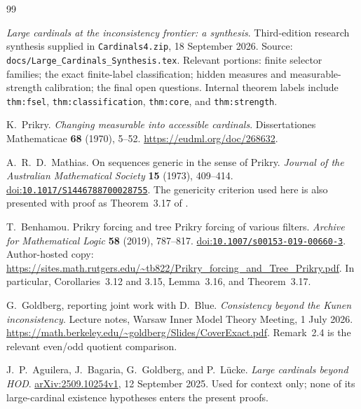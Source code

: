 \documentclass[11pt,letterpaper]{article}
\theoremstyle{definition}
\numberwithin{equation}{section}
\newcommand{\arxiv}[1]{\href{https://arxiv.org/abs/#1}{arXiv:#1}}
\newcommand{\doi}[1]{\href{https://doi.org/#1}{doi:\nolinkurl{#1}}}
\begin{document}
{}
\begin{thebibliography}{99}
\small
\setlength{\itemsep}{6pt}

\emph{Large cardinals at the inconsistency frontier: a synthesis}. Third-edition research synthesis supplied in \texttt{Cardinals4.zip}, 18 September 2026. Source: \nolinkurl{docs/Large_Cardinals_Synthesis.tex}. Relevant portions: finite selector families; the exact finite-label classification; hidden measures and measurable-strength calibration; the final open questions. Internal theorem labels include \texttt{thm:fsel}, \texttt{thm:classification}, \texttt{thm:core}, and \texttt{thm:strength}.

K.~Prikry. \emph{Changing measurable into accessible cardinals}. Dissertationes Mathematicae \textbf{68} (1970), 5--52. \url{https://eudml.org/doc/268632}.

A.~R.~D.~Mathias. On sequences generic in the sense of Prikry. \emph{Journal of the Australian Mathematical Society} \textbf{15} (1973), 409--414. \doi{10.1017/S1446788700028755}. The genericity criterion used here is also presented with proof as Theorem~3.17 of \cite{benhamou}.

T.~Benhamou. Prikry forcing and tree Prikry forcing of various filters. \emph{Archive for Mathematical Logic} \textbf{58} (2019), 787--817. \doi{10.1007/s00153-019-00660-3}. Author-hosted copy: \url{https://sites.math.rutgers.edu/~tb822/Prikry_forcing_and_Tree_Prikry.pdf}. In particular, Corollaries~3.12 and 3.15, Lemma~3.16, and Theorem~3.17.

G.~Goldberg, reporting joint work with D.~Blue. \emph{Consistency beyond the Kunen inconsistency}. Lecture notes, Warsaw Inner Model Theory Meeting, 1 July 2026. \url{https://math.berkeley.edu/~goldberg/Slides/CoverExact.pdf}. Remark~2.4 is the relevant even/odd quotient comparison.

J.~P.~Aguilera, J.~Bagaria, G.~Goldberg, and P.~L\"ucke. \emph{Large cardinals beyond HOD}. \arxiv{2509.10254v1}, 12 September 2025. Used for context only; none of its large-cardinal existence hypotheses enters the present proofs.

\end{thebibliography}
\end{document}
